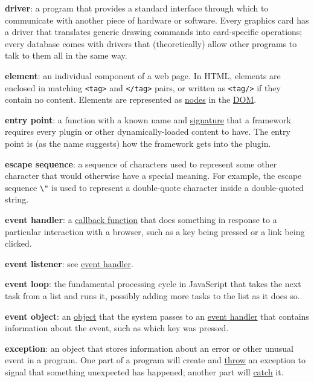 \textbf{driver}: a program that provides a standard interface through
which to communicate with another piece of hardware or software. Every
graphics card has a driver that translates generic drawing commands into
card-specific operations; every database comes with drivers that
(theoretically) allow other programs to talk to them all in the same
way.

\textbf{element}: an individual component of a web page. In HTML,
elements are enclosed in matching \texttt{\textless{}tag\textgreater{}}
and \texttt{\textless{}/tag\textgreater{}} pairs, or written as
\texttt{\textless{}tag/\textgreater{}} if they contain no content.
Elements are represented as \protect\hyperlink{g:node}{nodes} in the
\protect\hyperlink{g:dom}{DOM}.

\textbf{entry point}: a function with a known name and
\protect\hyperlink{g:signature}{signature} that a framework requires
every plugin or other dynamically-loaded content to have. The entry
point is (as the name suggests) how the framework gets into the plugin.

\textbf{escape sequence}: a sequence of characters used to represent
some other character that would otherwise have a special meaning. For
example, the escape sequence \texttt{\textbackslash{}"} is used to
represent a double-quote character inside a double-quoted string.

\textbf{event handler}: a
\protect\hyperlink{g:callback-function}{callback function} that does
something in response to a particular interaction with a browser, such
as a key being pressed or a link being clicked.

\textbf{event listener}: see \protect\hyperlink{g:event-handler}{event
handler}.

\textbf{event loop}: the fundamental processing cycle in JavaScript that
takes the next task from a list and runs it, possibly adding more tasks
to the list as it does so.

\textbf{event object}: an \protect\hyperlink{g:object}{object} that the
system passes to an \protect\hyperlink{g:event-handler}{event handler}
that contains information about the event, such as which key was
pressed.

\textbf{exception}: an object that stores information about an error or
other unusual event in a program. One part of a program will create and
\protect\hyperlink{g:throw}{throw} an exception to signal that something
unexpected has happened; another part will
\protect\hyperlink{g:catch}{catch} it.

